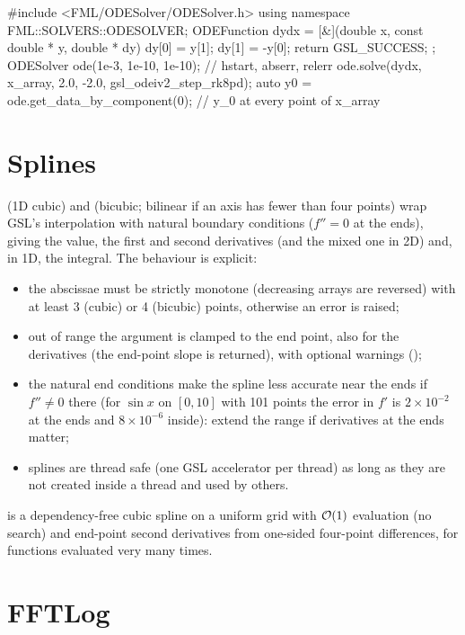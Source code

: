 \begin{cppcode}
#include <FML/ODESolver/ODESolver.h>
using namespace FML::SOLVERS::ODESOLVER;
ODEFunction dydx = [&](double x, const double * y, double * dy) {
    dy[0] = y[1];  dy[1] = -y[0];
    return GSL_SUCCESS;
};
ODESolver ode(1e-3, 1e-10, 1e-10);                 // hstart, abserr, relerr
ode.solve(dydx, x_array, {2.0, -2.0}, gsl_odeiv2_step_rk8pd);
auto y0 = ode.get_data_by_component(0);           // y_0 at every point of x_array
\end{cppcode}

\section{Splines}\label{sec:num-splines}

 (1D cubic) and  (bicubic; bilinear if an axis has fewer than four points) wrap GSL's
interpolation with natural boundary conditions ($f''=0$ at the ends), giving the value, the first and second derivatives
(and the mixed one in 2D) and, in 1D, the integral. The behaviour is explicit:
\begin{itemize}
\item the abscissae must be strictly monotone (decreasing arrays are reversed) with at least 3 (cubic) or 4 (bicubic) points,
      otherwise an error is raised;
\item out of range the argument is clamped to the end point, also for the derivatives (the end-point slope is returned),
      with optional warnings ();
\item the natural end conditions make the spline less accurate near the ends if $f''\neq0$ there (for $\sin x$ on $[0,10]$ with
      101 points the error in $f'$ is $2\times10^{-2}$ at the ends and $8\times10^{-6}$ inside): extend the range if derivatives
      at the ends matter;
\item splines are thread safe (one GSL accelerator per thread) as long as they are not created inside a thread and used by others.
\end{itemize}
 is a dependency-free cubic spline on a uniform grid with $\mathcal{O}(1)$ evaluation (no search) and end-point
second derivatives from one-sided four-point differences, for functions evaluated very many times.

\section{FFTLog}\label{sec:num-fftlog}

